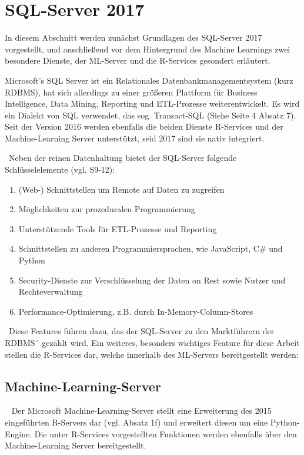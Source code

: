 \section{SQL-Server 2017}
\label{sec:SQLServer}
In diesem Abschnitt werden zunächst Grundlagen des SQL-Server 2017 vorgestellt, und anschließend vor dem Hintergrund des Machine Learnings zwei besondere Dienste, der ML-Server und die R-Services gesondert erläutert. 

Microsoft’s SQL Server ist ein Relationales Datenbankmanagementsystem (kurz RDBMS), hat sich allerdings zu einer größeren Plattform für Business Intelligence, Data Mining, Reporting und ETL-Prozesse weiterentwickelt. Es wird ein Dialekt von SQL verwendet, das sog. Transact-SQL (Siehe \cite{SQLData} Seite 4 Absatz 7). Seit der Version 2016 werden ebenfalls die beiden Dienste R-Services und der Machine-Learning Server unterstützt, seid 2017 sind sie nativ integriert. 

~\newline Neben der reinen Datenhaltung bietet der SQL-Server folgende Schlüsselelemente (vgl. \cite{SQLServerWP} S9-12):
\begin{enumerate}
	\item (Web-) Schnittstellen um Remote auf Daten zu zugreifen
	\item Möglichkeiten zur prozeduralen Programmierung
	\item Unterstützende Tools für ETL-Prozesse und Reporting
	\item Schnittstellen zu anderen Programmiersprachen, wie JavaScript, C\# und Python
	\item Security-Dienste zur Verschlüsselung der Daten on Rest sowie Nutzer und Rechteverwaltung
	\item Performance-Optimierung, z.B. durch In-Memory-Column-Stores
\end{enumerate}

~\newline Diese Features führen dazu, das der SQL-Server zu den Marktführern der RDBMS´ gezählt wird. Ein weiteres, besonders wichtiges Feature für diese Arbeit stellen die R-Services dar, welche innerhalb des ML-Servers bereitgestellt werden:

\subsection{Machine-Learning-Server} ~\newline
Der Microsoft Machine-Learning-Server stellt eine Erweiterung des 2015 eingeführten R-Servers dar (vgl. \cite{MLServerInfo} Absatz 1f) und erweitert diesen um eine Python-Engine. Die unter R-Services vorgestellten Funktionen werden ebenfalls über den Machine-Learning Server bereitgestellt. 

